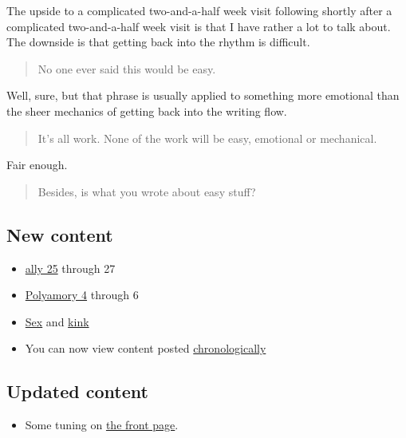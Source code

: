 The upside to a complicated two-and-a-half week visit following shortly after a complicated two-and-a-half week visit is that I have rather a lot to talk about. The downside is that getting back into the rhythm is difficult.

\begin{quote}
No one ever said this would be easy.
\end{quote}

Well, sure, but that phrase is usually applied to something more emotional than the sheer mechanics of getting back into the writing flow.

\begin{quote}
It's all work. None of the work will be easy, emotional or mechanical.
\end{quote}

Fair enough.

\begin{quote}
Besides, is what you wrote about easy stuff?
\end{quote}

\hypertarget{new-content}{%
\subsection{New content}\label{new-content}}

\begin{itemize}
\tightlist
\item
  \href{/25}{ally 25} through 27
\item
  \href{/poly/4}{Polyamory 4} through 6
\item
  \href{/sex}{Sex} and \href{/sex/kink}{kink}
\item
  You can now view content posted \href{/chronology}{chronologically}
\end{itemize}

\hypertarget{updated-content}{%
\subsection{Updated content}\label{updated-content}}

\begin{itemize}
\tightlist
\item
  Some tuning on \href{/}{the front page}.
\end{itemize}
